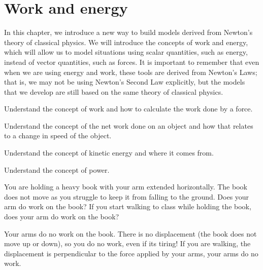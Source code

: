 \chapter{Work and energy}
\label{chap:workenergy}
In this chapter, we introduce a new way to build models derived from Newton's theory of classical physics. We will introduce the concepts of work and energy, which will allow us to model situations using scalar quantities, such as energy, instead of vector quantities, such as forces. It is important to remember that even when we are using energy and work, these tools are derived from Newton's Laws; that is, we may not be using Newton's Second Law explicitly, but the models that we develop are still based on the same theory of classical physics. 

\begin{learningObjectives}{
 \item Understand the concept of work and how to calculate the work done by a force.
 \item Understand the concept of the net work done on an object and how that relates to a change in speed of the object.
 \item Understand the concept of kinetic energy and where it comes from.
 \item Understand the concept of power.
 }
\end{learningObjectives}

\begin{opening}
You are holding a heavy book with your arm extended horizontally. The book does not move as you struggle to keep it from falling to the ground. Does your arm do work on the book? If you start walking to class while holding the book, does your arm do work on the book? 

\begin{answer}
Your arms do no work on the book. There is no displacement (the book does not move up or down), so you do no work, even if its tiring! If you are walking, the displacement is perpendicular to the force applied by your arms, your arms do no work.
\end{answer}
\end{opening}

